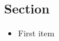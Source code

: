 \documentclass{article}
\begin{document}
\subsection{Section}
\nocite{test}

\begin{tcolorbox}[enhanced]
\printbibliography
\end{tcolorbox}

\begin{tcolorbox}[enhanced]
\begin{itemize}
\item First item
\end{itemize}
\end{tcolorbox}
\end{document}
